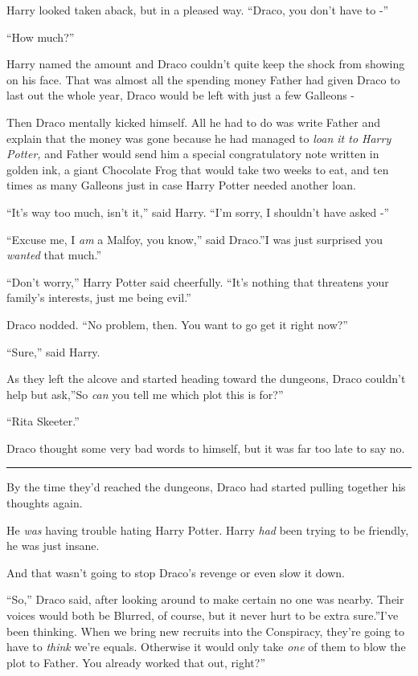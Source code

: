 Harry looked taken aback, but in a pleased way. ``Draco, you don't have
to -''

``How much?''

Harry named the amount and Draco couldn't quite keep the shock from
showing on his face. That was almost all the spending money Father had
given Draco to last out the whole year, Draco would be left with just a
few Galleons -

Then Draco mentally kicked himself. All he had to do was write Father
and explain that the money was gone because he had managed to \emph{loan
it to Harry Potter,} and Father would send him a special congratulatory
note written in golden ink, a giant Chocolate Frog that would take two
weeks to eat, and ten times as many Galleons just in case Harry Potter
needed another loan.

``It's way too much, isn't it,'' said Harry. ``I'm sorry, I shouldn't
have asked -''

``Excuse me, I \emph{am} a Malfoy, you know,'' said Draco.''I was just
surprised you \emph{wanted} that much.''

``Don't worry,'' Harry Potter said cheerfully. ``It's nothing that
threatens your family's interests, just me being evil.''

Draco nodded. ``No problem, then. You want to go get it right now?''

``Sure,'' said Harry.

As they left the alcove and started heading toward the dungeons, Draco
couldn't help but ask,''So \emph{can} you tell me which plot this is
for?''

``Rita Skeeter.''

Draco thought some very bad words to himself, but it was far too late to
say no.

\begin{center}\rule{3in}{0.4pt}\end{center}

By the time they'd reached the dungeons, Draco had started pulling
together his thoughts again.

He \emph{was} having trouble hating Harry Potter. Harry \emph{had} been
trying to be friendly, he was just insane.

And that wasn't going to stop Draco's revenge or even slow it down.

``So,'' Draco said, after looking around to make certain no one was
nearby. Their voices would both be Blurred, of course, but it never hurt
to be extra sure.''I've been thinking. When we bring new recruits into
the Conspiracy, they're going to have to \emph{think} we're equals.
Otherwise it would only take \emph{one} of them to blow the plot to
Father. You already worked that out, right?''

